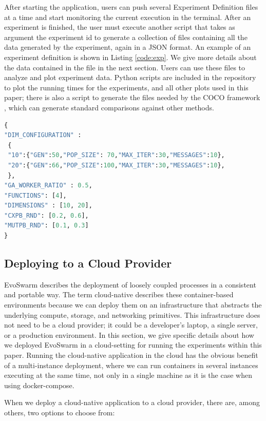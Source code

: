\documentclass[review]{elsarticle}
\begin{document}
After starting the application, users can push several Experiment Definition 
files at a time and start monitoring the current execution in the terminal.
After an experiment is finished, the user must execute another script
that takes as argument the experiment id to generate a collection of files containing all the
data generated by the experiment, again in a JSON format. An example of an 
experiment definition is shown in Listing \ref{code:exp}. We give more details about the 
data contained in the file in the next section. Users can use these files 
to analyze and plot experiment data.  Python
scripts are included in the repository to plot the running times for the
experiments, and all other plots used in this paper;  there is also a script to
generate the files needed by the COCO framework \cite{hansen2016coco}, which can generate standard
comparisons against other methods.


\begin{lstlisting}[language=Python, caption=Experiment definition example, label=code:exp]
{
"DIM_CONFIGURATION" : 
 {
 "10":{"GEN":50,"POP_SIZE": 70,"MAX_ITER":30,"MESSAGES":10},
 "20":{"GEN":66,"POP_SIZE":100,"MAX_ITER":30,"MESSAGES":10},
 },
"GA_WORKER_RATIO" : 0.5,
"FUNCTIONS": [4],
"DIMENSIONS" : [10, 20],
"CXPB_RND": [0.2, 0.6],
"MUTPB_RND": [0.1, 0.3]
}
\end{lstlisting}


\subsection{Deploying to a Cloud Provider}
\label{cloud-aws}


EvoSwarm describes the deployment of loosely coupled processes in a consistent
and portable way. The term cloud-native describes these container-based
environments because we can deploy them on an infrastructure that abstracts the
underlying compute, storage, and networking primitives. This infrastructure does
not need to be a cloud provider; it could be a developer's laptop, a single
server, or a production environment. In this section, we give specific details
about how we deployed EvoSwarm in a cloud-setting for running the experiments
within this paper. Running the cloud-native application in the cloud has the obvious
benefit of a multi-instance deployment, where we can run containers in several
instances executing at the same time, not only in a single machine as it is the case when using docker-compose. 

When we deploy a cloud-native application to a cloud provider, there
are, among others, two options to choose from:
\end{document}
